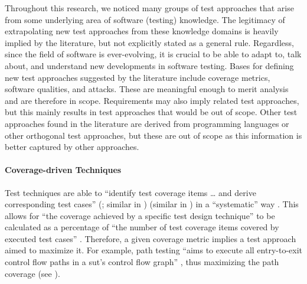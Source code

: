 Throughout this research, we noticed many groups of test approaches that arise
from some underlying area of software (testing) knowledge. The legitimacy of
extrapolating new test approaches from these knowledge domains is heavily
implied by the literature, but not explicitly stated as a general rule. Regardless,
since the field of software is ever-evolving, it is crucial to be able to
adapt to, talk about, and understand new developments in software testing.
Bases for defining new test approaches suggested by the literature include
coverage metrics, software qualities, and attacks. These are meaningful
enough to merit analysis and are therefore in scope. Requirements may also
imply related test approaches, but this mainly results in test approaches
that would be out of scope. Other test approaches found in the literature
are derived from programming languages or other orthogonal test approaches,
but these are out of scope as this information is better captured by other
approaches.

\ifnotpaper
    \paragraph{Coverage-driven Techniques}\label{cov-test}

    Test techniques are able to ``identify test coverage items \dots{} and
    derive corresponding test cases''
    \ifnotpaper
        (\citealp[p.~11]{IEEE2022}; similar in \citeyear[p.~467]{IEEE2017})
    \else
        \cite[p.~11]{IEEE2022} (similar in \cite[p.~467]{IEEE2017})
    \fi
    in a ``systematic'' way
    \citeyearpar[p.~464]{IEEE2017}.
    \ifnotpaper
        This allows for ``the coverage achieved by a specific test design
        technique'' to be calculated as a percentage of ``the number of test
        coverage items covered by executed test cases'' \citeyearpar[p.~30]{IEEE2021}.
    \fi %
    Therefore, a given coverage metric implies a test approach aimed to
    maximize it. For example, path testing ``aims to execute all entry-to-exit
    control flow paths in a \acs{sut}'s control flow graph'' \citep[p.~5-13]{SWEBOK2024},
    thus maximizing the path coverage
    \ifnotpaper
        \citep[see][Fig.~1]{SharmaEtAl2021}\else
        (see \cite[Fig.~1]{SharmaEtAl2021})\fi.

